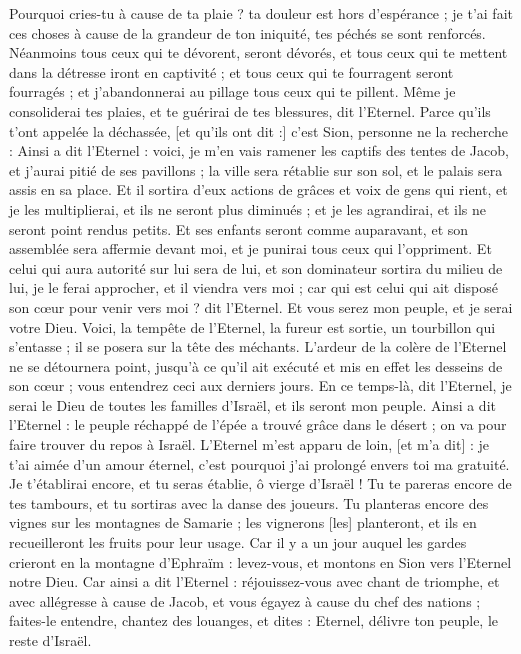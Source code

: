 \begin{multicols}{2}
Pourquoi cries-tu à cause de ta plaie ? ta douleur est hors d'espérance ; je t'ai fait ces choses à cause de la grandeur de ton iniquité, tes péchés se sont renforcés.
Néanmoins tous ceux qui te dévorent, seront dévorés, et tous ceux qui te mettent dans la détresse iront en captivité ; et tous ceux qui te fourragent seront fourragés ; et j'abandonnerai au pillage tous ceux qui te pillent.
Même je consoliderai tes plaies, et te guérirai de tes blessures, dit l'Eternel. Parce qu'ils t'ont appelée la déchassée, [et qu'ils ont dit :] c'est Sion, personne ne la recherche :
Ainsi a dit l'Eternel : voici, je m'en vais ramener les captifs des tentes de Jacob, et j'aurai pitié de ses pavillons ; la ville sera rétablie sur son sol, et le palais sera assis en sa place.
Et il sortira d'eux actions de grâces et voix de gens qui rient, et je les multiplierai, et ils ne seront plus diminués ; et je les agrandirai, et ils ne seront point rendus petits.
Et ses enfants seront comme auparavant, et son assemblée sera affermie devant moi, et je punirai tous ceux qui l'oppriment.
Et celui qui aura autorité sur lui sera de lui, et son dominateur sortira du milieu de lui, je le ferai approcher, et il viendra vers moi ; car qui est celui qui ait disposé son cœur pour venir vers moi ? dit l'Eternel.
Et vous serez mon peuple, et je serai votre Dieu.
Voici, la tempête de l'Eternel, la fureur est sortie, un tourbillon qui s'entasse ; il se posera sur la tête des méchants.
L'ardeur de la colère de l'Eternel ne se détournera point, jusqu’à ce qu'il ait exécuté et mis en effet les desseins de son cœur ; vous entendrez ceci aux derniers jours.
\VerseOne{}En ce temps-là, dit l'Eternel, je serai le Dieu de toutes les familles d'Israël, et ils seront mon peuple.
Ainsi a dit l'Eternel : le peuple réchappé de l'épée a trouvé grâce dans le désert ; on va pour faire trouver du repos à Israël.
L'Eternel m'est apparu de loin, [et m'a dit] : je t'ai aimée d'un amour éternel, c'est pourquoi j'ai prolongé envers toi ma gratuité.
Je t'établirai encore, et tu seras établie, ô vierge d'Israël ! Tu te pareras encore de tes tambours, et tu sortiras avec la danse des joueurs.
Tu planteras encore des vignes sur les montagnes de Samarie ; les vignerons [les] planteront, et ils en recueilleront les fruits pour leur usage.
Car il y a un jour auquel les gardes crieront en la montagne d'Ephraïm : levez-vous, et montons en Sion vers l'Eternel notre Dieu.
Car ainsi a dit l'Eternel : réjouissez-vous avec chant de triomphe, et avec allégresse à cause de Jacob, et vous égayez à cause du chef des nations ; faites-le entendre, chantez des louanges, et dites : Eternel, délivre ton peuple, le reste d'Israël.

\end{multicols}
